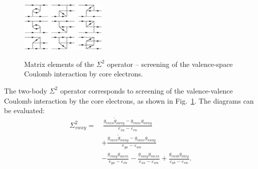 \documentclass[10pt,twocolumn,a4paper]{article}%
\newcommand{\be}{\begin{equation}}
\newcommand{\ee}{\end{equation}}
\def\en{\ensuremath{\varepsilon}}
\begin{document}
\begin{figure}%
\centering\tiny
\includegraphics[width=0.115\textwidth]{img/s2/s2_a1.pdf}
\includegraphics[width=0.115\textwidth]{img/s2/s2_a2.pdf}
\includegraphics[width=0.115\textwidth]{img/s2/s2_a3.pdf}\\
%
\includegraphics[width=0.115\textwidth]{img/s2/s2_b1.pdf}
\includegraphics[width=0.115\textwidth]{img/s2/s2_b2.pdf}
\includegraphics[width=0.115\textwidth]{img/s2/s2_b3.pdf}\\
%
\includegraphics[width=0.115\textwidth]{img/s2/s2_c1.pdf}
\includegraphics[width=0.115\textwidth]{img/s2/s2_c2.pdf}
\includegraphics[width=0.115\textwidth]{img/s2/s2_d.pdf}
\caption{\small Matrix elements of the $\Sigma^2$ operator -- screening of the valence-space Coulomb interaction by core electrons.\label{fig:CI-S2}}
\end{figure}


The two-body $\Sigma^2$ operator corresponds to screening of the valence-valence Coulomb interaction by the core electrons, as shown in Fig.~\ref{fig:CI-S2}.
The diagrams can be evaluated:
\be\begin{split}
    \Sigma^2_{vwxy} 
    =& ~
    \frac{g_{vnxa}\widetilde g_{awny}-g_{vnax}g_{awny}}
    {e_{xa}-\en_{vn}}\\
    &+
    \frac{g_{vaxn}\widetilde g_{nway}-g_{vanx} g_{nway}}{e_{ya}-\en_{wn}}
    \\
    &-\frac{g_{vnay}g_{awxn}}
    {e_{ya}-\en_{vn}}
    -\frac{g_{vany}g_{nwxa}}
    {e_{xa}-\en_{wn}}
    +
    \frac{g_{vwab}g_{abxy}}{\en_{ab}-\en_{vw}}.
\end{split}
\ee
\end{document}
